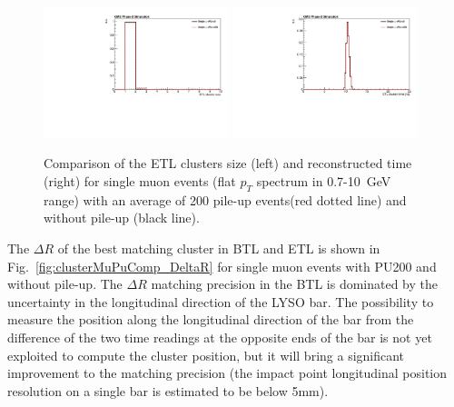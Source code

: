 \begin{figure}[!h]
\centering
\includegraphics[width=0.48\textwidth]{fig/performance/ClusterAndTracks/ETLbestCluster_size_muPUcomp.pdf}
\includegraphics[width=0.48\textwidth]{fig/performance/ClusterAndTracks/ETLbestCluster_time_muPUcomp.pdf}
\caption{Comparison of the ETL clusters size (left) and reconstructed time (right)
for single muon events (flat $p_{T}$ spectrum in 0.7-10~GeV range) with an average of 200 pile-up events(red dotted line) and without pile-up (black line).}
\label{fig:clusterMuPuComp_ETL}
\end{figure}

The $\Delta R$ of the best matching cluster in BTL and ETL is shown in Fig.~\ref{fig:clusterMuPuComp_DeltaR} for single muon events with PU200 and without pile-up.
The $\Delta R$ matching precision in the BTL is dominated by the uncertainty in the longitudinal direction of the LYSO bar. The possibility to measure the position along the longitudinal direction of the bar from the difference of the two time readings at the opposite ends of the bar is not yet exploited to compute the cluster position, but it will bring a significant improvement to the matching precision (the impact point longitudinal position resolution on a single bar is estimated to be below 5mm). 

